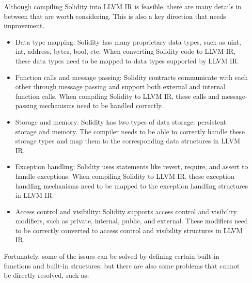 Although compiling Solidity into LLVM IR is feasible, there are many details in between that are worth considering. This is also a key direction that needs improvement.

\begin{itemize}
    \item Data type mapping: Solidity has many proprietary data types, such as uint, int, address, bytes, bool, etc. When converting Solidity code to LLVM IR, these data types need to be mapped to data types supported by LLVM IR.

    \item Function calls and message passing: Solidity contracts communicate with each other through message passing and support both external and internal function calls. When compiling Solidity to LLVM IR, these calls and message-passing mechanisms need to be handled correctly.

    \item Storage and memory: Solidity has two types of data storage: persistent storage and memory. The compiler needs to be able to correctly handle these storage types and map them to the corresponding data structures in LLVM IR.

    \item Exception handling: Solidity uses statements like revert, require, and assert to handle exceptions. When compiling Solidity to LLVM IR, these exception handling mechanisms need to be mapped to the exception handling structures in LLVM IR.

    \item Access control and visibility: Solidity supports access control and visibility modifiers, such as private, internal, public, and external. These modifiers need to be correctly converted to access control and visibility structures in LLVM IR.
\end{itemize}

Fortunately, some of the issues can be solved by defining certain built-in functions and built-in structures, but there are also some problems that cannot be directly resolved, such as:

